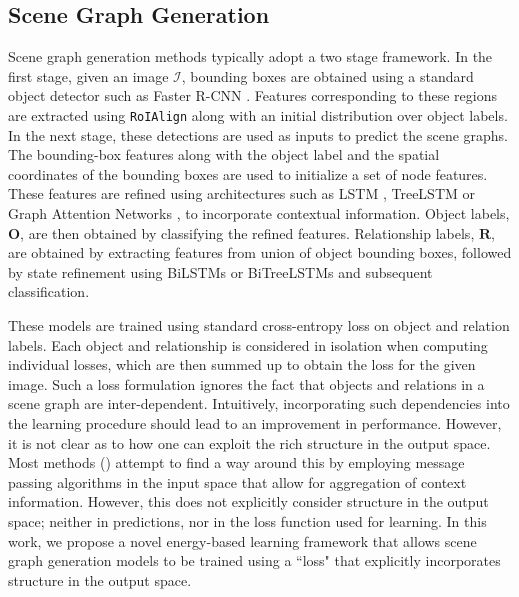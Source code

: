 \documentclass[final]{cvpr}
\newcommand{\imagerep}{\mathcal{I}}
\newcommand{\objectlabelrepeq}{\mathbf{O}}
\newcommand{\relationlabelrepeq}{\mathbf{R}}
\begin{document}
\subsection{Scene Graph Generation}
Scene graph generation methods typically adopt a two stage framework. In the first stage, given an image $\imagerep$, bounding boxes 
are obtained using a standard object detector such as Faster R-CNN \cite{ren2015faster}. Features
corresponding to these regions are extracted using {\tt RoIAlign} along with an initial distribution over object labels. 
In the next stage, these detections are used as inputs to predict the scene graphs. The bounding-box features along with the object label and the spatial coordinates of the bounding boxes are used to initialize a set of node features. These features are refined using architectures such as LSTM \cite{zellers2018neural}, TreeLSTM \cite{tang2019learning} or Graph Attention Networks \cite{yang2018graph}, to incorporate contextual information. Object labels, $\objectlabelrepeq$, are then obtained by classifying the refined features. Relationship labels, $\relationlabelrepeq$, are obtained by extracting features from union of object bounding boxes, followed by state refinement using BiLSTMs \cite{zellers2018neural} or BiTreeLSTMs \cite{tang2019learning} and subsequent classification. 

These models are trained using standard cross-entropy loss on object and relation labels. Each object and relationship is considered in isolation when computing individual losses, which are then summed up to obtain the loss for the given image. Such a loss formulation ignores the fact that objects and relations in a scene graph are inter-dependent. Intuitively, incorporating such dependencies into the learning procedure should lead to an improvement in performance. However, it is not clear as to how one can exploit the rich structure in the output space. Most methods (\cite{tang2019learning,xu2017scene, yang2018graph,zellers2018neural}) attempt to find a way around this by employing message passing algorithms in the input space that allow for aggregation of context information. However, this does not explicitly consider structure in the output space; neither in predictions, nor in the loss function used for learning. 
In this work, we propose a novel energy-based learning framework that allows scene graph generation models to be trained using a ``loss" that explicitly incorporates structure in the output space.
\end{document}
